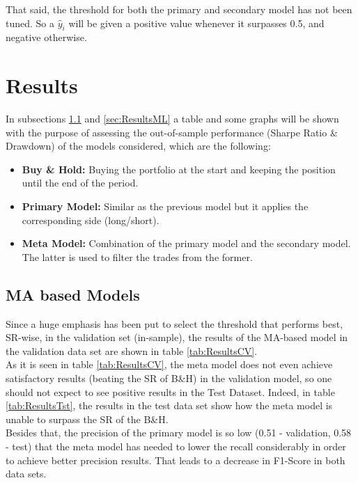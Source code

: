 \documentclass[a4paper]{article}
\begin{document}
That said, the threshold for both the primary and secondary model has 
not been tuned. So a $\hat{y}_i$ will be given a positive value 
whenever it surpasses 0.5, and negative otherwise.

\section{Results}
In subsections \ref{sec:ResultsMA} and \ref{sec:ResultsML} a table and 
some graphs will be shown with the purpose of assessing the 
out-of-sample performance (Sharpe Ratio \& Drawdown) of the models 
considered, which are the following:

\begin{itemize}
	\item \textbf{Buy \& Hold:} Buying the portfolio at the start and 
	keeping the position until the end of the period.
	
	\item \textbf{Primary Model:} Similar as the previous model but it 
	applies the corresponding side (long/short).
	
	\item \textbf{Meta Model:} Combination of the primary model and 
	the secondary model. The latter is used to filter the trades 
	from the former.
\end{itemize}

\subsection{MA based Models}
\label{sec:ResultsMA}
Since a huge emphasis has been put to select the threshold that 
performs best, SR-wise, in the validation set (in-sample), the results 
of the MA-based model in the validation data set are shown in table 
\ref{tab:ResultsCV}.\\

As it is seen in table \ref{tab:ResultsCV}, the meta model does not 
even achieve satisfactory results (beating the SR of B\&H) in the 
validation model, so one should not expect to see positive results in 
the Test Dataset. Indeed, in table \ref{tab:ResultsTst}, the results 
in the test data set show how the meta model is unable to surpass the 
SR of the B\&H.\\

Besides that, the precision of the primary model is so low (0.51 -
validation, 0.58 - test) that the meta model has needed to lower the 
recall considerably in order to achieve better precision results. That 
leads to a decrease in F1-Score in both data sets.\\
\end{document}
